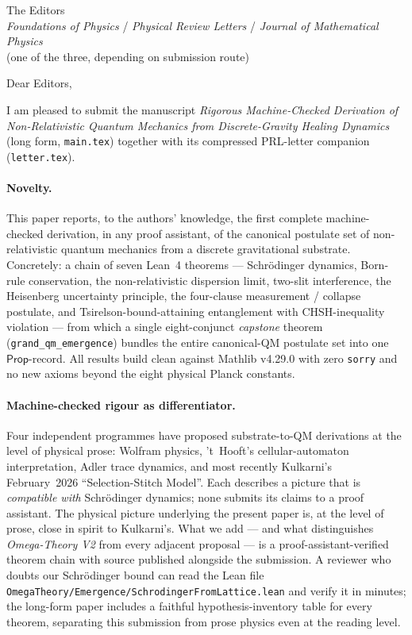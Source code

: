 \documentclass[11pt,a4paper]{letter}
\begin{document}
\begin{letter}{%
  The Editors\\
  \emph{Foundations of Physics} / \emph{Physical Review Letters} / \emph{Journal of Mathematical Physics}\\
  (one of the three, depending on submission route)}

\opening{Dear Editors,}

I am pleased to submit the manuscript \emph{Rigorous Machine-Checked
Derivation of Non-Relativistic Quantum Mechanics from Discrete-Gravity
Healing Dynamics} (long form, \texttt{main.tex}) together with its
compressed PRL-letter companion (\texttt{letter.tex}).

\paragraph{Novelty.}
This paper reports, to the authors' knowledge, the first complete
machine-checked derivation, in any proof assistant, of the canonical
postulate set of non-relativistic quantum mechanics from a discrete
gravitational substrate. Concretely: a chain of seven Lean~4 theorems
--- Schr\"odinger dynamics, Born-rule conservation, the
non-relativistic dispersion limit, two-slit interference, the
Heisenberg uncertainty principle, the four-clause measurement /
collapse postulate, and Tsirelson-bound-attaining entanglement with
CHSH-inequality violation --- from which a single eight-conjunct
\emph{capstone} theorem (\texttt{grand\_qm\_emergence}) bundles the
entire canonical-QM postulate set into one $\mathsf{Prop}$-record.
All results build clean against Mathlib v4.29.0 with zero
\texttt{sorry} and no new axioms beyond the eight physical Planck
constants.

\paragraph{Machine-checked rigour as differentiator.}
Four independent programmes have proposed substrate-to-QM derivations
at the level of physical prose: Wolfram physics, 't~Hooft's
cellular-automaton interpretation, Adler trace dynamics, and most
recently Kulkarni's February~2026 ``Selection-Stitch Model''. Each
describes a picture that is \emph{compatible with} Schr\"odinger
dynamics; none submits its claims to a proof assistant. The physical
picture underlying the present paper is, at the level of prose, close
in spirit to Kulkarni's. What we add --- and what distinguishes
\emph{Omega-Theory V2} from every adjacent proposal --- is a
proof-assistant-verified theorem chain with source published
alongside the submission. A reviewer who doubts our Schr\"odinger
bound can read the Lean file
\texttt{OmegaTheory/Emergence/SchrodingerFromLattice.lean} and
verify it in minutes; the long-form paper includes a faithful
hypothesis-inventory table for every theorem, separating this
submission from prose physics even at the reading level.


\end{letter}
\end{document}
